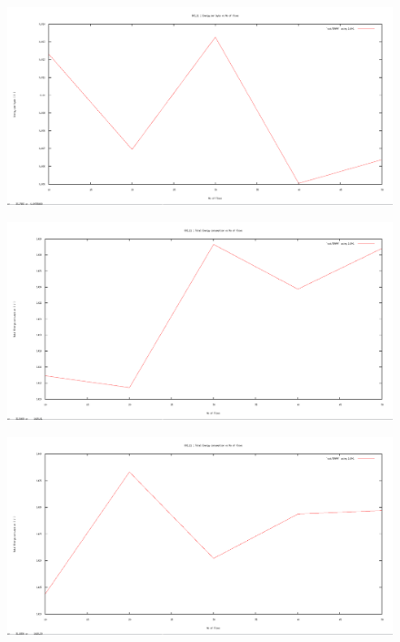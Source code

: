 \documentclass[12pt]{article}
\begin{document}
\begin{figure}[H]
	\centering
	\includegraphics[scale=	0.26]{image/apics/am_energyperbyte_vs_flows.png}
\end{figure}

\begin{figure}[H]
	\centering
	\includegraphics[scale=	0.26]{image/bpics/bm_energyconsumption_vs_flows.png}
\end{figure}

\begin{figure}[H]
	\centering
	\includegraphics[scale=	0.26]{image/apics/am_energyconsumption_vs_flows.png}
\end{figure}
\end{document}
